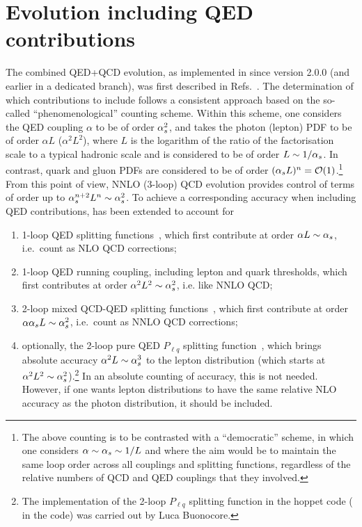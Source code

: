 \section{Evolution including QED contributions}
\label{sec:qed-evolution}

The combined QED+QCD evolution, as implemented in \hoppet since
version 2.0.0 (and earlier in a dedicated  branch), was first
described in
Refs.~\cite{Manohar:2016nzj,Manohar:2017eqh,Buonocore:2020nai,Buonocore:2021bsf}.
%
The determination of which contributions to include follows a
consistent approach based on the so-called ``phenomenological'' counting
scheme.
%
Within this scheme, one considers the QED coupling $\alpha$ to be of order $\alpha_s^2$, and takes the
photon (lepton) PDF to be of order $\alpha L$ ($\alpha^2 L^2$), where
$L$ is the logarithm of the
ratio of the factorisation scale to a typical hadronic scale and is considered to be of order $L \sim 1/\alpha_s$.
In contrast, quark and gluon
PDFs are considered to be of order $(\alpha_s L)^n={\cal O}(1)$.\footnote{The
  above counting is to be contrasted with a ``democratic'' scheme, in
  which one considers $\alpha \sim \alpha_s \sim 1/L$ and where the aim would be to maintain
  the same loop order across all couplings and splitting functions,
  regardless of the relative numbers of QCD and QED couplings that
  they involved.}
%
From this point of view, NNLO (3-loop) QCD evolution provides control of
terms of order up to $\alpha_s^{n+2} L^n \sim \alpha_s^2$.
%
To achieve a corresponding accuracy when including QED contributions,
\hoppet has been extended to account for
\begin{enumerate}
\item \label{item:qed1} 1-loop QED splitting functions~\cite{Roth:2004ti}, which first
  contribute at order $\alpha L \sim \alpha_s$, i.e.\ count as NLO QCD
  corrections;
  
\item \label{item:qed2} 1-loop QED running coupling, including lepton and quark
  thresholds, which first contributes at order $\alpha^2 L^2 \sim
  \alpha_s^2$, i.e. like NNLO QCD; 
  
\item \label{item:qed3} 2-loop mixed QCD-QED splitting
  functions~\cite{deFlorian:2015ujt},
  which first contribute at order
  $\alpha \alpha_s L \sim \alpha_s^2$, i.e.\ count as NNLO QCD corrections;

\item \label{item:qed4} optionally, the 2-loop pure QED $P_{\ell q}$ splitting
  function~\cite{deFlorian:2016gvk}, which brings absolute accuracy
  $\alpha^2 L\sim \alpha_s^3$ to the lepton distribution (which starts at
  $\alpha^2 L^2 \sim \alpha_s^2$).\footnote{The implementation of the 2-loop $P_{\ell q}$ splitting
  function in the hoppet code ( in the code) was carried out by Luca Buonocore.}
  In an absolute counting of accuracy, this is not needed.
  However, if one wants lepton distributions to have the same relative
  NLO accuracy as the photon distribution, it should be
  included.
\end{enumerate}

